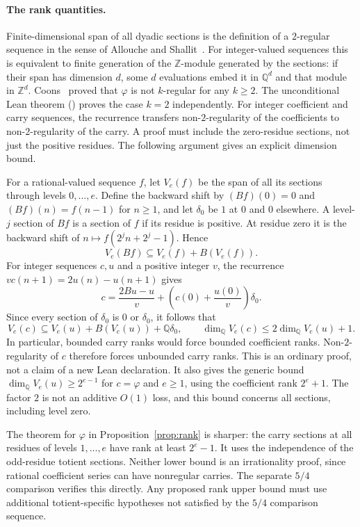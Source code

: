 \documentclass[11pt]{article}
\theoremstyle{plain}
\theoremstyle{definition}
\theoremstyle{remark}
\newcommand{\lean}[2]{\leanlink{#2}}
\newcommand{\Q}{\mathbb{Q}}
\begin{document}
\paragraph{The rank quantities.}
Finite-dimensional span of all dyadic sections is the definition of a
$2$-regular sequence in the sense of Allouche and
Shallit~\cite[Definition~2.1]{allouche-shallit}.  For
integer-valued sequences this is equivalent to finite generation of the
$\mathbb Z$-module generated by the sections: if their span has dimension $d$,
some $d$ evaluations embed it in $\mathbb Q^d$ and that module in
$\mathbb Z^d$.
Coons~\cite[Theorem~3.2]{coons} proved that
$\varphi$ is not $k$-regular for any $k\ge2$.  The
unconditional Lean theorem
(\lean{Erdos249257.\allowbreak not_finiteDimensional_\allowbreak span_fullTotientKernel}{TotientMahlerDefect.lean:1145})
proves the case $k=2$ independently.  For integer coefficient and carry sequences, the recurrence transfers
non-$2$-regularity of the coefficients to non-$2$-regularity of the carry.
A proof must include the zero-residue sections, not just the positive
residues. The following argument gives an explicit dimension bound.

For a rational-valued sequence $f$, let $V_e(f)$ be the span of all its sections
through levels $0,\ldots,e$. Define the backward shift by
$(Bf)(0)=0$ and $(Bf)(n)=f(n-1)$ for $n\ge1$, and let $\delta_0$ be $1$
at $0$ and $0$ elsewhere. A level-$j$ section of $Bf$ is a section of
$f$ if its residue is positive. At residue zero it is the backward shift
of $n\mapsto f(2^jn+2^j-1)$. Hence
\[
 V_e(Bf)\subseteq V_e(f)+B(V_e(f)).
\]
For integer sequences $c,u$ and a positive integer $v$, the recurrence
$v c(n+1)=2u(n)-u(n+1)$ gives
\[
 c=\frac{2Bu-u}{v}+\left(c(0)+\frac{u(0)}v\right)\delta_0.
\]
Since every section of $\delta_0$ is $0$ or $\delta_0$, it follows that
\[
 V_e(c)\subseteq V_e(u)+B(V_e(u))+\Q\delta_0,
 \qquad \dim_{\Q} V_e(c)\le2\dim_{\Q} V_e(u)+1.
\]
In particular, bounded carry ranks would force bounded coefficient ranks.
Non-$2$-regularity of $c$ therefore forces unbounded carry ranks.
This is an ordinary proof, not a claim of a new Lean declaration.
It also gives the generic bound
$\dim_{\Q} V_e(u)\ge2^{e-1}$ for $c=\varphi$ and $e\ge1$, using the
coefficient rank $2^e+1$. The factor $2$ is not an additive $O(1)$ loss,
and this bound concerns all sections, including level zero.

The theorem for $\varphi$ in Proposition~\ref{prop:rank} is sharper: the carry sections at all
residues of levels $1,\ldots,e$ have rank at least $2^e-1$. It uses the independence of the odd-residue
totient sections. Neither lower bound is an irrationality proof, since
rational coefficient series can have nonregular carries. The separate
$5/4$ comparison verifies this directly. Any proposed rank upper bound must
use additional totient-specific hypotheses not satisfied by the $5/4$
comparison sequence.
\end{document}
